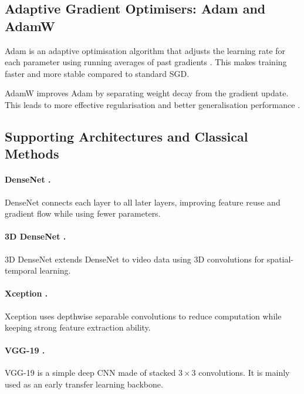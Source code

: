 \subsection{Adaptive Gradient Optimisers: Adam and AdamW}
\label{sec:bg:adam}

Adam is an adaptive optimisation algorithm that adjusts the learning rate for each parameter using running averages of past gradients \cite{kingma_adam_2015}. This makes training faster and more stable compared to standard SGD.

AdamW improves Adam by separating weight decay from the gradient update. This leads to more effective regularisation and better generalisation performance \cite{loshchilov_adamw_2019}.
\subsection{Supporting Architectures and Classical Methods}
\label{sec:bg:glossary}

\paragraph{DenseNet \cite{huang_densenet_2017}.}
DenseNet connects each layer to all later layers, improving feature reuse and gradient flow while using fewer parameters.

\paragraph{3D DenseNet \cite{mehta_three-dimensional_2022}.}
3D DenseNet extends DenseNet to video data using 3D convolutions for spatial-temporal learning.

\paragraph{Xception \cite{chollet_xception_2017}.}
Xception uses depthwise separable convolutions to reduce computation while keeping strong feature extraction ability.

\paragraph{VGG-19 \cite{simonyan_vgg_2015}.}
VGG-19 is a simple deep \ac{CNN} made of stacked $3\times3$ convolutions. It is mainly used as an early transfer learning backbone.

